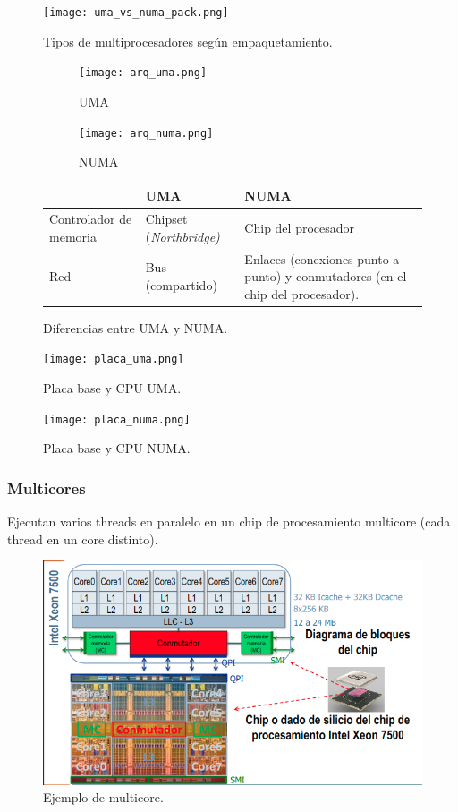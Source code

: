 \documentclass[12pt,spanish]{article}
\begin{document}
\begin{figure}[H]
\centering
\texttt{[image: uma\_vs\_numa\_pack.png]}
\caption{Tipos de multiprocesadores según empaquetamiento.}
\end{figure}

\begin{figure}[H]
\centering
\begin{subfigure}{0.3\textwidth}
\texttt{[image: arq\_uma.png]}
\caption{UMA}
\end{subfigure}
\quad
\begin{subfigure}{0.3\textwidth}
\texttt{[image: arq\_numa.png]}
\caption{NUMA}
\end{subfigure}
\vspace{1cm}
\begin{tabular}{|m{3cm}|m{5cm}|m{5cm}|}
\hline
&\textbf{UMA} & \textbf{NUMA} \\
 \hline
Controlador de memoria & Chipset (\textit{Northbridge)} & Chip del procesador \\
\hline
Red & Bus (compartido) & Enlaces (conexiones punto a punto) y conmutadores (en el chip del procesador).\\
\hline
\end{tabular}
\caption{Diferencias entre UMA y NUMA.}
\end{figure}

\begin{figure}[H]
\centering
\texttt{[image: placa\_uma.png]}
\caption{Placa base y CPU UMA.}
\end{figure}

\begin{figure}[H]
\centering
\texttt{[image: placa\_numa.png]}
\caption{Placa base y CPU NUMA.}
\end{figure}


\subsubsection{Multicores}

Ejecutan varios threads en paralelo en un chip de procesamiento multicore (cada thread en un core distinto).

\begin{figure}[H]
\centering
\includegraphics[scale=0.65]{cmp.png}
\caption{Ejemplo de multicore.}
\end{figure}
\end{document}
